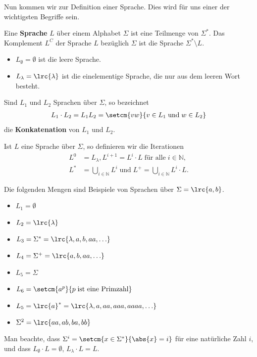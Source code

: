 Nun kommen wir zur Definition einer Sprache. Dies wird für uns einer der wichtigsten Begriffe sein.
\begin{mydefinition}[Sprache]\label{mydefinition:Sprache}
Eine \textbf{Sprache} $L$ über einem Alphabet $\Sigma$ ist eine Teilmenge von $\Sigma^*$. Das Komplement $L^C$ der Sprache $L$ bezüglich $\Sigma$ ist die Sprache $\Sigma^*\setminus L$.
\begin{itemize}
	\item $L_{\emptyset} = \emptyset$ ist die leere Sprache.
	\item $L_{\lambda} = \lrc{\lambda}$ ist die einelementige Sprache, die nur aus dem leeren Wort besteht.
\end{itemize}
Sind $L_1$ und $L_2$ Sprachen über $\Sigma$, so bezeichnet
\begin{align*}
	L_1\cdot L_2 = L_1L_2 = \setcm{vw}{v\in L_1\; \text{und}\; w\in L_2}
\end{align*}
die \textbf{Konkatenation} von $L_1$ und $L_2$.

Ist $L$ eine Sprache über $\Sigma$, so definieren wir die Iterationen
\begin{align*}
	L^0 & = L_{\lambda}, L^{i+1} = L^i\cdot L\;\text{für alle}\; i\in\mathbb{N},                \\
	L^* & = \bigcup_{i\in\mathbb{N}}L^i\;\text{und}\; L^+ = \bigcup_{i\in\mathbb{N}}L^i\cdot L.
\end{align*}
\end{mydefinition}

\begin{myexample}
Die folgenden Mengen sind Beispiele von Sprachen über $\Sigma = \lrc{a,b}$.
\begin{itemize}
	\item $L_1 = \emptyset$
	\item $L_2 = \lrc{\lambda}$
	\item $L_3 = \Sigma^* = \lrc{\lambda, a,b,aa,\ldots }$
	\item $L_4 = \Sigma^+ = \lrc{a,b,aa,\ldots }$
	\item $L_5 = \Sigma$
	\item $L_6 = \setcm{a^p}{p\;\text{ist eine Primzahl}}$
	\item $L_5 = \lrc{a}^* = \lrc{\lambda, a, aa, aaa, aaaa, \ldots }$
	\item $\Sigma^2 = \lrc{aa,ab,ba,bb}$
\end{itemize}
\end{myexample}
Man beachte, dass $\Sigma^i = \setcm{x\in\Sigma^*}{\abs{x} = i}$ für eine natürliche Zahl $i$, und dass $L_{\emptyset}\cdot L = \emptyset$, $L_{\lambda}\cdot L = L$.


